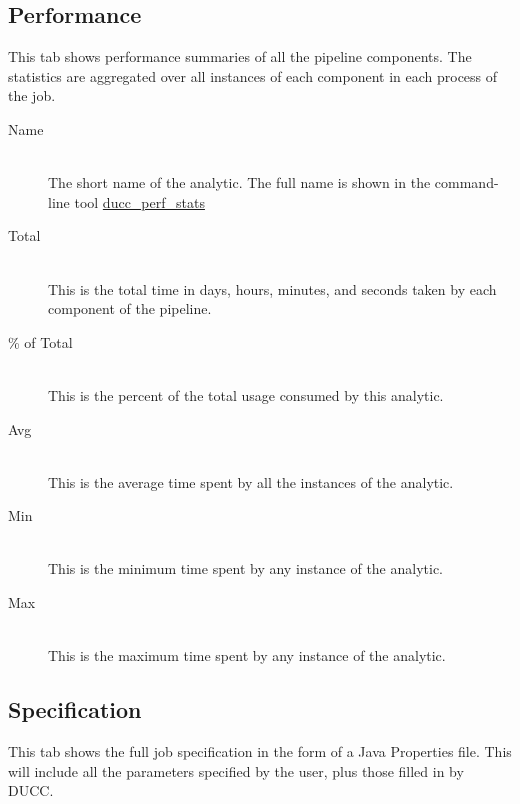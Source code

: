    \subsection{Performance}
   \label{sec:performance}
   This tab shows performance summaries of all the pipeline components.  The statistics
   are aggregated over all instances of each component in each process of the job.
   
   \begin{description}
     \item[Name]  \hfill \\
       The short name of the analytic.  The full name is shown in the command-line
       tool \hyperref[sec:cli.ducc-perf-stats]{ducc\_perf\_stats}
     \item[Total]  \hfill \\
       This is the total time in days, hours, minutes, and seconds taken by each
       component of the pipeline.
     \item[\% of Total]  \hfill \\
       This is the percent of the total usage consumed by this analytic.
     \item[Avg]  \hfill \\
       This is the average time spent by all the instances of the analytic.
     \item[Min]  \hfill \\
       This is the minimum time spent by any instance of the analytic.
     \item[Max]  \hfill \\
       This is the maximum time spent by any instance of the analytic.
   \end{description}
   
   \subsection{Specification}
   This tab shows the full job specification in the form of a Java Properties
   file.  This will include all the parameters specified by the user, plus those
   filled in by DUCC.
